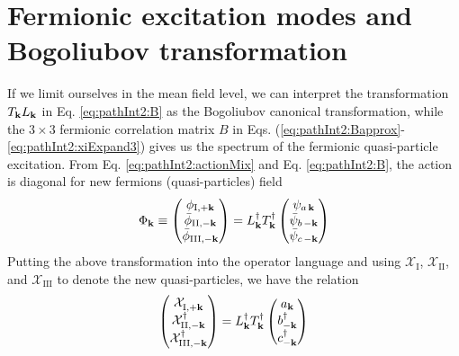 \section{Fermionic excitation modes and Bogoliubov transformation\label{sec:pathInt2:bog}}
If we limit ourselves in the mean field level, we can interpret the transformation $T_{\mathbf{k}}{}L_{\mathbf{k}}$ in Eq. \eqref{eq:pathInt2:B} as the Bogoliubov canonical transformation, while  the $3\times3$ fermionic correlation matrix $B$ in Eqs. (\ref{eq:pathInt2:Bapprox}-\ref{eq:pathInt2:xiExpand3}) gives us the spectrum of the  fermionic quasi-particle excitation. From Eq. \eqref{eq:pathInt2:actionMix} and Eq. \eqref{eq:pathInt2:B}, the action is diagonal for new fermions (quasi-particles) field 
\begin{equation*}
\Phi_\vk\equiv\mtrx{\phi_{\text{\Rmnum{1}},+\vk}\\\bar\phi_{\text{\Rmnum{2}},-\vk}\\\bar\phi_{\text{\Rmnum{3}},-\vk}}
=L^{\dg}_{\vk}T^{\dg}_{\vk}\mtrx{\psi_{a\,\vk}\\\bar\psi_{b\,-\vk}\\\bar\psi_{c\,-\vk}}
\end{equation*}
Putting the above transformation into the operator language and using $\mathcal{X}_{\text{I}}$, $\mathcal{X}_{\text{II}}$, and $\mathcal{X}_{\text{III}}$ to denote the new quasi-particles,  we have the relation 
\begin{equation}
\mtrx{\mathcal{X}^{}_{\text{\Rmnum{1}},+\vk}\\\mathcal{X}_{\text{II},-\vk}^{\dg}\\\mathcal{X}_{\text{III},-\vk}^{\dg}}
=L^{\dg}_{\vk}T^{\dg}_{\vk}  \mtrx{a_{\vk}\\b_{-\vk}^{\dg}\\c_{-\vk}^{\dg}}
\end{equation}   

